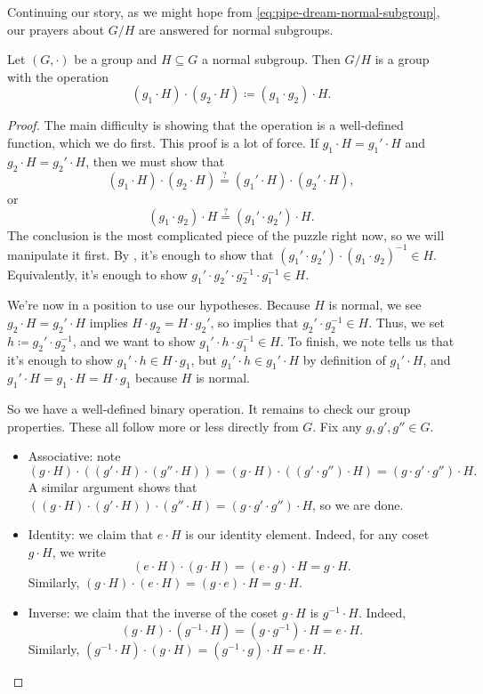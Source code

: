 \documentclass[../notes.tex]{subfiles}
\begin{document}
Continuing our story, as we might hope from \eqref{eq:pipe-dream-normal-subgroup}, our prayers about $G/H$ are answered for normal subgroups.
\begin{proposition}
    Let $(G,\cdot)$ be a group and $H\subseteq G$ a normal subgroup. Then $G/H$ is a group with the operation
    \[(g_1\cdot H)\cdot(g_2\cdot H)\coloneqq(g_1\cdot g_2)\cdot H.\]
\end{proposition}
\begin{proof}
    The main difficulty is showing that the operation is a well-defined function, which we do first. This proof is a lot of force. If $g_1\cdot H=g_1'\cdot H$ and $g_2\cdot H=g_2'\cdot H$, then we must show that
    \[(g_1\cdot H)\cdot(g_2\cdot H)\stackrel?=(g_1'\cdot H)\cdot(g_2'\cdot H),\]
    or
    \[(g_1\cdot g_2)\cdot H\stackrel?=(g_1'\cdot g_2')\cdot H.\]
    The conclusion is the most complicated piece of the puzzle right now, so we will manipulate it first. By , it's enough to show that $(g_1'\cdot g_2')\cdot(g_1\cdot g_2)^{-1}\in H$. Equivalently, it's enough to show $g_1'\cdot g_2'\cdot g_2^{-1}\cdot g_1^{-1}\in H$.
    
    We're now in a position to use our hypotheses. Because $H$ is normal, we see $g_2\cdot H=g_2'\cdot H$ implies $H\cdot g_2=H\cdot g_2'$, so  implies that $g_2'\cdot g_2^{-1}\in H$. Thus, we set $h\coloneqq g_2'\cdot g_2^{-1}$, and we want to show $g_1'\cdot h\cdot g_1^{-1}\in H$. To finish, we note  tells us that it's enough to show $g_1'\cdot h\in H\cdot g_1$, but $g_1'\cdot h\in g_1'\cdot H$ by definition of $g_1'\cdot H$, and $g_1'\cdot H=g_1\cdot H=H\cdot g_1$ because $H$ is normal.
    
    So we have a well-defined binary operation. It remains to check our group properties. These all follow more or less directly from $G$. Fix any $g,g',g''\in G$.
    \begin{itemize}
        \item Associative: note
        \[(g\cdot H)\cdot((g'\cdot H)\cdot(g''\cdot H))=(g\cdot H)\cdot((g'\cdot g'')\cdot H)=(g\cdot g'\cdot g'')\cdot H.\]
        A similar argument shows that $((g\cdot H)\cdot(g'\cdot H))\cdot(g''\cdot H)=(g\cdot g'\cdot g'')\cdot H$, so we are done.
        \item Identity: we claim that $e\cdot H$ is our identity element. Indeed, for any coset $g\cdot H$, we write
        \[(e\cdot H)\cdot(g\cdot H)=(e\cdot g)\cdot H=g\cdot H.\]
        Similarly, $(g\cdot H)\cdot(e\cdot H)=(g\cdot e)\cdot H=g\cdot H$.
        \item Inverse: we claim that the inverse of the coset $g\cdot H$ is $g^{-1}\cdot H$. Indeed,
        \[(g\cdot H)\cdot\left(g^{-1}\cdot H\right)=\left(g\cdot g^{-1}\right)\cdot H=e\cdot H.\]
        Similarly, $\left(g^{-1}\cdot H\right)\cdot(g\cdot H)=\left(g^{-1}\cdot g\right)\cdot H=e\cdot H$.
        \qedhere
    \end{itemize}
\end{proof}
\end{document}
